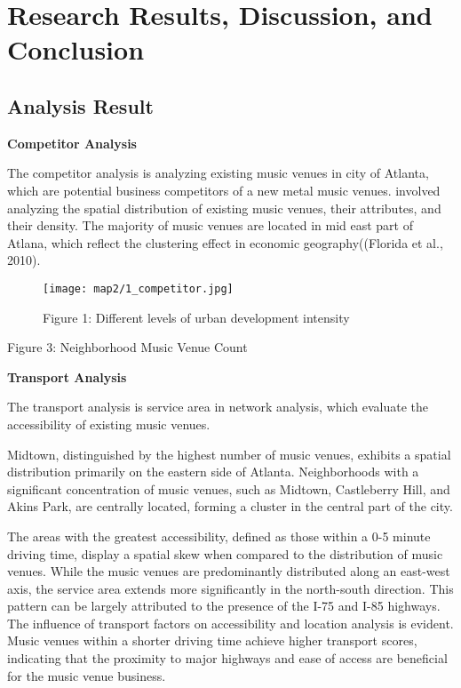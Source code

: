 \documentclass[11pt]{article}
\begin{document}
\section{Research Results, Discussion, and Conclusion}
\subsection{Analysis Result}

\textbf{Competitor Analysis}

The competitor analysis is analyzing existing music venues in city of Atlanta, which are potential business competitors of a new metal music venues.
involved analyzing the spatial distribution of existing music venues, their attributes, and their density. 
The majority of music venues are located in mid east part of Atlana, which reflect the clustering effect in economic geography((Florida et al., 2010).

\begin{figure}[H]
\begin{center}
\centering
\texttt{[image: map2/1\_competitor.jpg]}
\caption{Figure 1: Different levels of urban development intensity}
\label{fig:figure1}
\end{center}
\end{figure}

\begin{center}
\centering
Figure 3: Neighborhood Music Venue Count
\end{center}


\textbf{Transport Analysis}

The transport analysis is service area in network analysis, which evaluate the accessibility of existing music venues. 

Midtown, distinguished by the highest number of music venues, exhibits a spatial distribution primarily on the eastern side of Atlanta. Neighborhoods with a significant concentration of music venues, such as Midtown, Castleberry Hill, and Akins Park, are centrally located, forming a cluster in the central part of the city.

The areas with the greatest accessibility, defined as those within a 0-5 minute driving time, display a spatial skew when compared to the distribution of music venues. While the music venues are predominantly distributed along an east-west axis, the service area extends more significantly in the north-south direction. This pattern can be largely attributed to the presence of the I-75 and I-85 highways. The influence of transport factors on accessibility and location analysis is evident. Music venues within a shorter driving time achieve higher transport scores, indicating that the proximity to major highways and ease of access are beneficial for the music venue business.
\end{document}
